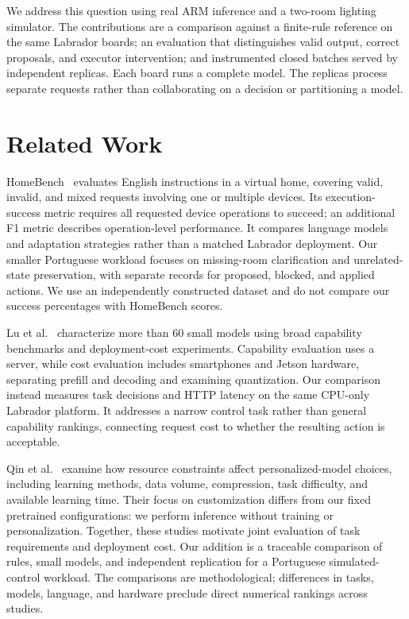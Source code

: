 \documentclass[letterpaper,conference]{IEEEtran}
\begin{document}
We address this question using real ARM inference and a two-room lighting simulator. The contributions are a comparison against a finite-rule reference on the same Labrador boards; an evaluation that distinguishes valid output, correct proposals, and executor intervention; and instrumented closed batches served by independent replicas. Each board runs a complete model. The replicas process separate requests rather than collaborating on a decision or partitioning a model.

\section{Related Work}
HomeBench~\cite{homebench} evaluates English instructions in a virtual home, covering valid, invalid, and mixed requests involving one or multiple devices. Its execution-success metric requires all requested device operations to succeed; an additional F1 metric describes operation-level performance. It compares language models and adaptation strategies rather than a matched Labrador deployment. Our smaller Portuguese workload focuses on missing-room clarification and unrelated-state preservation, with separate records for proposed, blocked, and applied actions. We use an independently constructed dataset and do not compare our success percentages with HomeBench scores.

Lu et al.~\cite{edge} characterize more than 60 small models using broad capability benchmarks and deployment-cost experiments. Capability evaluation uses a server, while cost evaluation includes smartphones and Jetson hardware, separating prefill and decoding and examining quantization. Our comparison instead measures task decisions and HTTP latency on the same CPU-only Labrador platform. It addresses a narrow control task rather than general capability rankings, connecting request cost to whether the resulting action is acceptable.

Qin et al.~\cite{empirical} examine how resource constraints affect personalized-model choices, including learning methods, data volume, compression, task difficulty, and available learning time. Their focus on customization differs from our fixed pretrained configurations: we perform inference without training or personalization. Together, these studies motivate joint evaluation of task requirements and deployment cost. Our addition is a traceable comparison of rules, small models, and independent replication for a Portuguese simulated-control workload. The comparisons are methodological; differences in tasks, models, language, and hardware preclude direct numerical rankings across studies.
\end{document}
